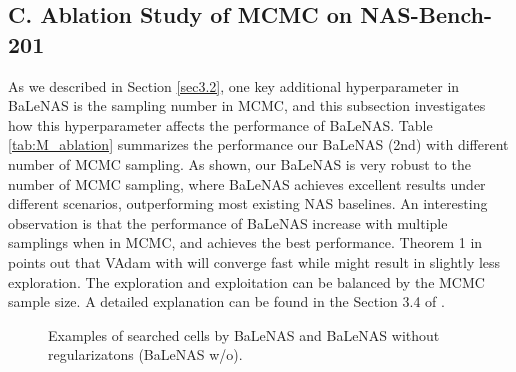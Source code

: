 \documentclass[10pt,twocolumn,letterpaper]{article}
\begin{document}
\subsection*{C. Ablation Study of MCMC on NAS-Bench-201}
As we described in Section \ref{sec3.2}, one key additional hyperparameter in BaLeNAS is the sampling number  in MCMC, and this subsection investigates how this hyperparameter affects the performance of BaLeNAS. Table \ref{tab:M_ablation} summarizes the performance our BaLeNAS (2nd) with different number of MCMC sampling. As shown, our BaLeNAS is very robust to the  number of MCMC sampling, where BaLeNAS achieves excellent results under different scenarios, outperforming most existing NAS baselines. An interesting observation is that the performance of BaLeNAS increase with multiple samplings when  in MCMC, and  achieves the best performance. Theorem 1 in \cite{khan2018fast} points out that VAdam with  will converge fast while might result in slightly less exploration. The exploration and exploitation can be balanced by the MCMC sample size. A detailed explanation can be found in the Section 3.4 of \cite{khan2018fast}. 








\begin{figure}
  
  
  
 \caption{Examples of searched cells by BaLeNAS and BaLeNAS without regularizatons (BaLeNAS w/o).}
 \label{fig:cellexamples}
\end{figure}
\end{document}
